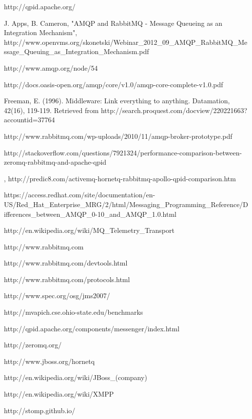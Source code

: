 \documentclass{thesis}
\begin{document}
\begin{singlespace}
\begin{thebibliography}{99}
 http://qpid.apache.org/

 J. Apps, B. Cameron, "AMQP and RabbitMQ - Message Queueing as an Integration Mechanism", http://www.openvms.org/skonetski/Webinar\_2012\_09\_AMQP\_RabbitMQ\_Message\_Queuing\_as\_Integration\_Mechanism.pdf

 http://www.amqp.org/node/54

 http://docs.oasis-open.org/amqp/core/v1.0/amqp-core-complete-v1.0.pdf

 Freeman, E. (1996). Middleware: Link everything to anything. Datamation, 42(16), 119-119. Retrieved from http://search.proquest.com/docview/220221663?accountid=37764

 http://www.rabbitmq.com/wp-uploads/2010/11/amqp-broker-prototype.pdf

 http://stackoverflow.com/questions/7921324/performance-comparison-between-zeromq-rabbitmq-and-apache-qpid

 , http://predic8.com/activemq-hornetq-rabbitmq-apollo-qpid-comparison.htm

 https://access.redhat.com/site/documentation/en-US/Red\_Hat\_Enterprise\_MRG/2/html/Messaging\_Programming\_Reference/Differences\_between\_AMQP\_0-10\_and\_AMQP\_1.0.html

 http://en.wikipedia.org/wiki/MQ\_Telemetry\_Transport

 http://www.rabbitmq.com

 http://www.rabbitmq.com/devtools.html

 http://www.rabbitmq.com/protocols.html

 http://www.spec.org/osg/jms2007/

 http://mvapich.cse.ohio-state.edu/benchmarks

 http://qpid.apache.org/components/messenger/index.html

 http://zeromq.org/

 http://www.jboss.org/hornetq

 http://en.wikipedia.org/wiki/JBoss\_(company)

 http://en.wikipedia.org/wiki/XMPP

 http://stomp.github.io/


\end{thebibliography}
\end{singlespace}
\end{document}
